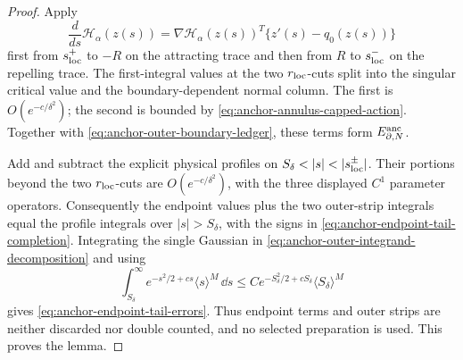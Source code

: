\begin{proof}
Apply
\[
 \frac{d}{ds}\mathscr H_\alpha(z(s))
 =\nabla\mathscr H_\alpha(z(s))^T
       \{z'(s)-q_0(z(s))\}
\]
first from \(s_{\rm loc}^+\) to \(-R\) on the attracting trace and then
from \(R\) to \(s_{\rm loc}^-\) on the repelling trace.  The first-integral
values at the two \(r_{\rm loc}\)-cuts split into the singular critical
value and the boundary-dependent normal column.  The first is
\(O(e^{-c/\delta^2})\); the second is bounded by
\cref{eq:anchor-annulus-capped-action}.  Together with
\cref{eq:anchor-outer-boundary-ledger}, these terms form
\(E_{\partial,N}^{\rm anc}\).

Add and subtract the explicit physical profiles on
\(S_\delta<|s|<|s_{\rm loc}^\pm|\).  Their portions beyond the two
\(r_{\rm loc}\)-cuts are \(O(e^{-c/\delta^2})\), with the three displayed
\(C^1\) parameter operators.
Consequently the endpoint values plus the two outer-strip integrals equal
the profile integrals over \(|s|>S_\delta\), with the signs in
\cref{eq:anchor-endpoint-tail-completion}.  Integrating the single Gaussian
in \cref{eq:anchor-outer-integrand-decomposition} and using
\begin{equation}
 \int_{S_\delta}^{\infty}
 e^{-s^2/2+cs}\langle s\rangle^M\,\dd s
 \le C e^{-S_\delta^2/2+cS_\delta}
       \langle S_\delta\rangle^M                   \label{eq:anchor-single-Gaussian-tail}
\end{equation}
gives \cref{eq:anchor-endpoint-tail-errors}.  Thus endpoint terms and outer
strips are neither discarded nor double counted, and no selected
preparation is used.  This proves the lemma.
\end{proof}


